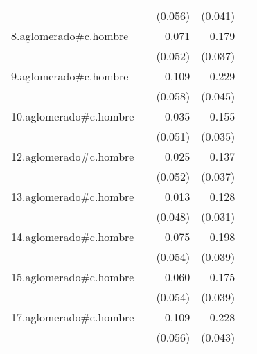 {\begin{longtable}{l*{4}{D{.}{.}{-1}}}
            &                     &     (0.056)         &     (0.041)         &                     \\
\addlinespace
8.aglomerado#c.hombre&                     &       0.071         &       0.179\sym{***}&                     \\
            &                     &     (0.052)         &     (0.037)         &                     \\
\addlinespace
9.aglomerado#c.hombre&                     &       0.109         &       0.229\sym{***}&                     \\
            &                     &     (0.058)         &     (0.045)         &                     \\
\addlinespace
10.aglomerado#c.hombre&                     &       0.035         &       0.155\sym{***}&                     \\
            &                     &     (0.051)         &     (0.035)         &                     \\
\addlinespace
12.aglomerado#c.hombre&                     &       0.025         &       0.137\sym{***}&                     \\
            &                     &     (0.052)         &     (0.037)         &                     \\
\addlinespace
13.aglomerado#c.hombre&                     &       0.013         &       0.128\sym{***}&                     \\
            &                     &     (0.048)         &     (0.031)         &                     \\
\addlinespace
14.aglomerado#c.hombre&                     &       0.075         &       0.198\sym{***}&                     \\
            &                     &     (0.054)         &     (0.039)         &                     \\
\addlinespace
15.aglomerado#c.hombre&                     &       0.060         &       0.175\sym{***}&                     \\
            &                     &     (0.054)         &     (0.039)         &                     \\
\addlinespace
17.aglomerado#c.hombre&                     &       0.109         &       0.228\sym{***}&                     \\
            &                     &     (0.056)         &     (0.043)         &                     \\

\end{longtable}}
